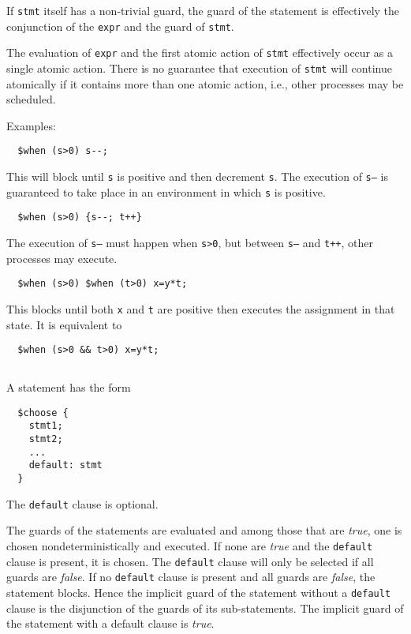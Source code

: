 \documentclass[11pt]{book}
\begin{document}
If \texttt{stmt} itself has a non-trivial guard, the guard of the
\cwhen{} statement is effectively the conjunction of the \texttt{expr}
and the guard of \texttt{stmt}.

The evaluation of \texttt{expr} and the first atomic action of
\texttt{stmt} effectively occur as a single atomic action.  There is
no guarantee that execution of \texttt{stmt} will continue atomically
if it contains more than one atomic action, i.e., other processes may
be scheduled.

Examples:
\begin{verbatim}
  $when (s>0) s--;
\end{verbatim}
This will block until \texttt{s} is positive and then decrement
\texttt{s}.  The execution of \texttt{s--} is guaranteed to take place
in an environment in which \texttt{s} is positive.

\begin{verbatim}
  $when (s>0) {s--; t++}
\end{verbatim}
The execution of \texttt{s--} must happen when \texttt{s>0}, but
between \texttt{s--} and \texttt{t++}, other processes may execute.

\begin{verbatim}
  $when (s>0) $when (t>0) x=y*t;
\end{verbatim}
This blocks until both \texttt{x} and \texttt{t} are positive then
executes the assignment in that state.  It is equivalent to
\begin{verbatim}
  $when (s>0 && t>0) x=y*t;
\end{verbatim}

\subsection{\cchoose}  A \cchoose{} statement has the form
\begin{verbatim}
  $choose {
    stmt1;
    stmt2;
    ...
    default: stmt
  }
\end{verbatim}
The \texttt{default} clause is optional.

The guards of the statements are evaluated and among those that are
\emph{true}, one is chosen nondeterministically and executed.  If none
are \emph{true} and the \texttt{default} clause is present, it is
chosen.  The \texttt{default} clause will only be selected if all
guards are \emph{false}.  If no \texttt{default} clause is present and
all guards are \emph{false}, the statement blocks.  Hence the implicit
guard of the \cchoose{} statement without a \texttt{default} clause is
the disjunction of the guards of its sub-statements.  The implicit
guard of the \cchoose{} statement with a default clause is
\emph{true}.
\end{document}
